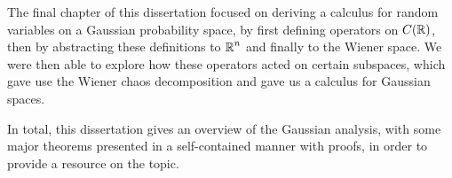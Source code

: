 \documentclass[12pt]{report}
\begin{document}
The final chapter of this dissertation focused on deriving a calculus for random variables on a Gaussian probability space, by first defining operators on $C(\operatorname{\mathbb{R}})$, then by abstracting these definitions to $\operatorname{\mathbb{R}}^n$ and finally to the Wiener space. We were then able to explore how these operators acted on certain subspaces, which gave use the Wiener chaos decomposition and gave us a calculus for Gaussian spaces.

In total, this dissertation gives an overview of the Gaussian analysis, with some major theorems presented in a self-contained manner with proofs, in order to provide a resource on the topic.

\printbibliography[title = {References}]
\end{document}
